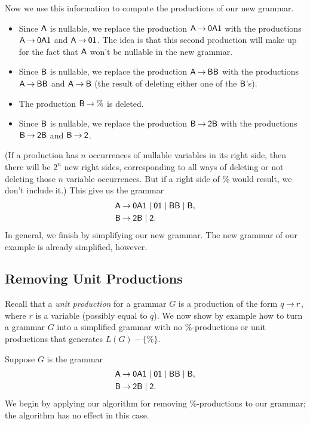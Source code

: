Now we use this information to compute the productions of
our new grammar.
\begin{itemize}
\item Since $\mathsf{A}$ is nullable, we replace the production
  $\mathsf{A}\mathbin{\to}\mathsf{0A1}$ with the productions $\mathsf{A}\mathbin{\to}\mathsf{0A1}$
  and $\mathsf{A}\mathbin{\to}\mathsf{01}$.  The idea is that this second production
  will make up for the fact that $\mathsf{A}$ won't be nullable in the new
  grammar.

\item Since $\mathsf{B}$ is nullable, we replace the production
  $\mathsf{A}\mathbin{\to}\mathsf{BB}$ with the productions $\mathsf{A}\mathbin{\to}\mathsf{BB}$ and
  $\mathsf{A}\mathbin{\to}\mathsf{B}$ (the result of deleting either one of the
  $\mathsf{B}$'s).

\item The production $\mathsf{B}\mathbin{\to}\%$ is deleted.

\item Since $\mathsf{B}$ is nullable, we replace the production
  $\mathsf{B}\mathbin{\to}\mathsf{2B}$ with the productions $\mathsf{B}\mathbin{\to}\mathsf{2B}$ and
  $\mathsf{B}\mathbin{\to}\mathsf{2}$.
\end{itemize}
(If a production has $n$ occurrences of nullable variables in its
right side, then there will be $2^n$ new right sides, corresponding to
all ways of deleting or not deleting those $n$ variable
occurrences. But if a right side of $\%$ would result, we don't
include it.)
This give us the grammar
\begin{align*}
\mathsf{A} &\mathbin{\to} \mathsf{0A1} \mid \mathsf{01} \mid \mathsf{BB} \mid \mathsf{B} , \\
\mathsf{B} &\mathbin{\to} \mathsf{2B} \mid \mathsf{2} .
\end{align*}
In general, we finish by simplifying our new grammar.  The new grammar
of our example is already simplified, however.

\subsection{Removing Unit Productions}

Recall that a \emph{unit production} for a grammar $G$ is a production
of the form $q\mathbin{\to} r$, where $r$ is a variable (possibly equal to
$q$).  We now show by example how to turn a grammar $G$ into a
simplified grammar with no $\%$-productions or unit productions that
generates $L(G)-\{\%\}$.

Suppose $G$ is the grammar
\begin{align*}
\mathsf{A} &\mathbin{\to} \mathsf{0A1} \mid \mathsf{01} \mid \mathsf{BB} \mid \mathsf{B} , \\
\mathsf{B} &\mathbin{\to} \mathsf{2B} \mid \mathsf{2} .
\end{align*}
We begin by applying our algorithm for removing $\%$-productions to
our grammar; the algorithm has no effect in this case.

